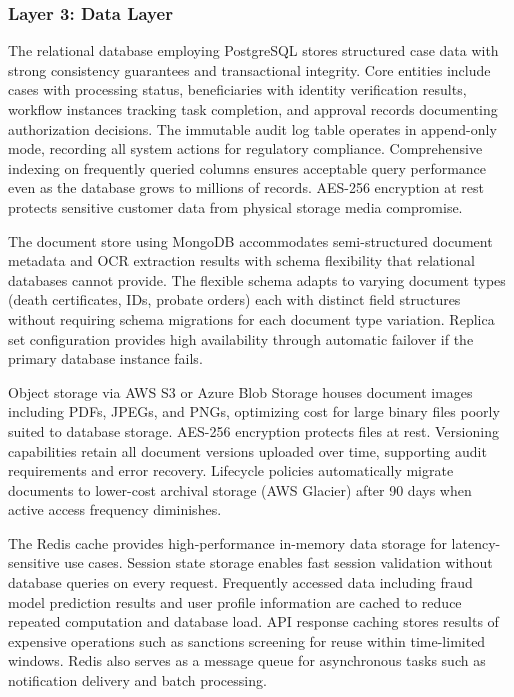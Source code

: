 \subsubsection{Layer 3: Data Layer}

The relational database employing PostgreSQL stores structured case data with strong consistency guarantees and transactional integrity. Core entities include cases with processing status, beneficiaries with identity verification results, workflow instances tracking task completion, and approval records documenting authorization decisions. The immutable audit log table operates in append-only mode, recording all system actions for regulatory compliance. Comprehensive indexing on frequently queried columns ensures acceptable query performance even as the database grows to millions of records. AES-256 encryption at rest protects sensitive customer data from physical storage media compromise.

The document store using MongoDB accommodates semi-structured document metadata and OCR extraction results with schema flexibility that relational databases cannot provide. The flexible schema adapts to varying document types (death certificates, IDs, probate orders) each with distinct field structures without requiring schema migrations for each document type variation. Replica set configuration provides high availability through automatic failover if the primary database instance fails.

Object storage via AWS S3 or Azure Blob Storage houses document images including PDFs, JPEGs, and PNGs, optimizing cost for large binary files poorly suited to database storage. AES-256 encryption protects files at rest. Versioning capabilities retain all document versions uploaded over time, supporting audit requirements and error recovery. Lifecycle policies automatically migrate documents to lower-cost archival storage (AWS Glacier) after 90 days when active access frequency diminishes.

The Redis cache provides high-performance in-memory data storage for latency-sensitive use cases. Session state storage enables fast session validation without database queries on every request. Frequently accessed data including fraud model prediction results and user profile information are cached to reduce repeated computation and database load. API response caching stores results of expensive operations such as sanctions screening for reuse within time-limited windows. Redis also serves as a message queue for asynchronous tasks such as notification delivery and batch processing.

